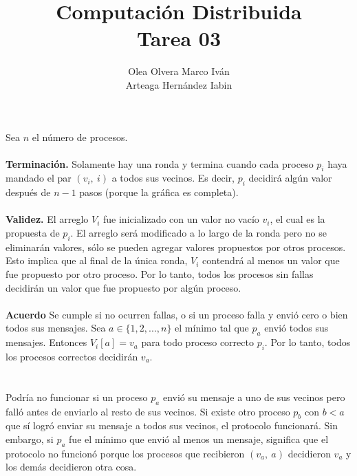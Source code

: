 \documentclass{article}
\title{Computación Distribuida \\ Tarea 03}
\author{Olea Olvera Marco Iván \\ Arteaga Hernández Iabin}
\date{}
\begin{document}
\maketitle

\section{}

Sea $n$ el número de procesos. \\ \\
\textbf{Terminación.} Solamente hay una ronda y termina cuando cada proceso $p_i$ haya mandado el par $(v_i,\ i)$ a todos sus vecinos. Es decir, $p_i$ decidirá algún valor después de $n - 1$ pasos (porque la gráfica es completa). \\ \\
\textbf{Validez.} El arreglo $V_i$ fue inicializado con un valor no vacío $v_i$, el cual es la propuesta de $p_i$. El arreglo será modificado a lo largo de la ronda pero no se eliminarán valores, sólo se pueden agregar valores propuestos por otros procesos. Esto implica que al final de la única ronda, $V_i$ contendrá al menos un valor que fue propuesto por otro proceso. Por lo tanto, todos los procesos sin fallas decidirán un valor que fue propuesto por algún proceso. \\ \\
\textbf{Acuerdo} Se cumple si no ocurren fallas, o si un proceso falla y envió cero o bien todos sus mensajes. Sea $a \in \{1,2,...,n\}$ el mínimo tal que $p_a$ envió todos sus mensajes. Entonces $V_i[a] = v_a$ para todo proceso correcto $p_i$. Por lo tanto, todos los procesos correctos decidirán $v_a$. \\

\section{}

Podría no funcionar si un proceso $p_a$ envió su mensaje a uno de sus vecinos pero falló antes de enviarlo al resto de sus vecinos. Si existe otro proceso $p_b$ con $b < a$ que sí logró enviar su mensaje a todos sus vecinos, el protocolo funcionará. Sin embargo, si $p_a$ fue el mínimo que envió al menos un mensaje, significa que el protocolo no funcionó porque los procesos que recibieron $(v_a,\ a)$ decidieron $v_a$ y los demás decidieron otra cosa.

\section{}
\end{document}

